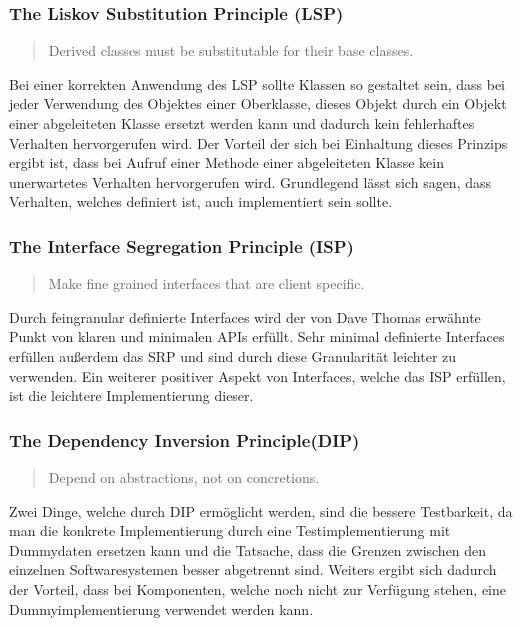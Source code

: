 \subsubsection{The Liskov Substitution Principle (LSP)}
\begin{quotation}
	Derived classes must be substitutable for their base classes.
\end{quotation}

Bei einer korrekten Anwendung des LSP sollte Klassen so gestaltet sein, dass bei jeder Verwendung des Objektes einer Oberklasse, dieses Objekt durch ein Objekt einer abgeleiteten Klasse ersetzt werden kann und dadurch kein fehlerhaftes Verhalten hervorgerufen wird. Der Vorteil der sich bei Einhaltung dieses Prinzips ergibt ist, dass bei Aufruf einer Methode einer abgeleiteten Klasse kein unerwartetes Verhalten hervorgerufen wird. Grundlegend lässt sich sagen, dass Verhalten, welches definiert ist, auch implementiert sein sollte.  

\subsubsection{The Interface Segregation Principle (ISP)}
\begin{quotation}
	Make fine grained interfaces that are client specific.
\end{quotation}

Durch feingranular definierte Interfaces wird der von Dave Thomas erwähnte Punkt von klaren und minimalen APIs erfüllt. Sehr minimal definierte Interfaces erfüllen außerdem das SRP und sind durch diese Granularität leichter zu verwenden. Ein weiterer positiver Aspekt von Interfaces, welche das ISP erfüllen, ist die leichtere Implementierung dieser.

\subsubsection{The Dependency Inversion Principle(DIP)}
\begin{quotation}
	Depend on abstractions, not on concretions.
\end{quotation}

Zwei Dinge, welche durch DIP ermöglicht werden, sind die bessere Testbarkeit, da man die konkrete Implementierung durch eine Testimplementierung mit Dummydaten ersetzen kann und die Tatsache, dass die Grenzen zwischen den einzelnen Softwaresystemen besser abgetrennt sind. Weiters ergibt sich dadurch der Vorteil, dass bei Komponenten, welche noch nicht zur Verfügung stehen, eine Dummyimplementierung verwendet werden kann. 